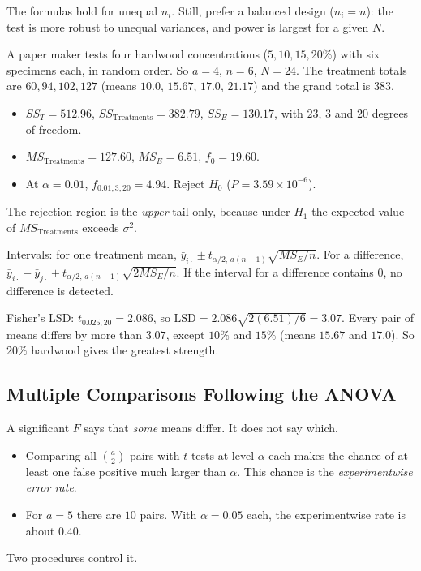 The formulas hold for unequal $n_i$. Still, prefer a balanced design ($n_i=n$): the test is more robust to unequal variances, and power is largest for a given $N$.

\begin{example}
A paper maker tests four hardwood concentrations ($5,10,15,20\%$) with six specimens each, in random order. So $a=4$, $n=6$, $N=24$. The treatment totals are $60,94,102,127$ (means $10.0,\,15.67,\,17.0,\,21.17$) and the grand total is $383$.
\begin{itemize}
  \item $SS_T=512.96$, $SS_{\text{Treatments}}=382.79$, $SS_E=130.17$, with $23$, $3$ and $20$ degrees of freedom.
  \item $MS_{\text{Treatments}}=127.60$, $MS_E=6.51$, $f_0=19.60$.
  \item At $\alpha=0.01$, $f_{0.01,3,20}=4.94$. Reject $H_0$ ($P=3.59\times10^{-6}$).
\end{itemize}
The rejection region is the \emph{upper} tail only, because under $H_1$ the expected value of $MS_{\text{Treatments}}$ exceeds $\sigma^2$.

Intervals: for one treatment mean, $\bar{y}_{i\cdot}\pm t_{\alpha/2,\,a(n-1)}\sqrt{MS_E/n}$. For a difference, $\bar{y}_{i\cdot}-\bar{y}_{j\cdot}\pm t_{\alpha/2,\,a(n-1)}\sqrt{2MS_E/n}$. If the interval for a difference contains $0$, no difference is detected.

Fisher's LSD: $t_{0.025,20}=2.086$, so $\mathrm{LSD}=2.086\sqrt{2(6.51)/6}=3.07$. Every pair of means differs by more than $3.07$, except $10\%$ and $15\%$ (means $15.67$ and $17.0$). So $20\%$ hardwood gives the greatest strength.
\end{example}

\subsection{Multiple Comparisons Following the ANOVA}

A significant $F$ says that \emph{some} means differ. It does not say which.

\begin{itemize}
  \item Comparing all $\binom a2$ pairs with $t$-tests at level $\alpha$ each makes the chance of at least one false positive much larger than $\alpha$. This chance is the \emph{experimentwise error rate}.
  \item For $a=5$ there are $10$ pairs. With $\alpha=0.05$ each, the experimentwise rate is about $0.40$.
\end{itemize}
Two procedures control it.

